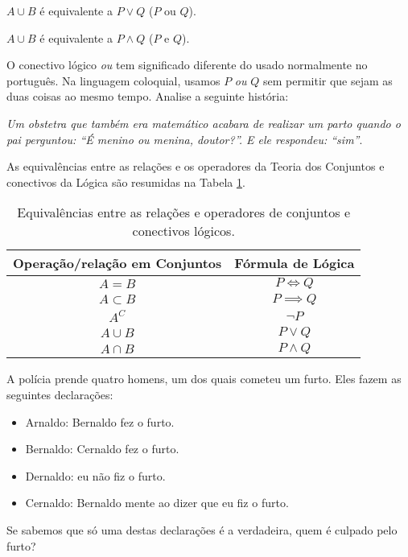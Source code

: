 \begin{equivalence}
$A \cup B$ é equivalente a $P \lor Q$ ($P \text{ ou } Q$).
\end{equivalence}

\begin{equivalence}
$A \cup B$ é equivalente a $P \land Q$ ($P \text{ e } Q$).
\end{equivalence}

\begin{remark}
O conectivo lógico \textit{ou} tem significado diferente do usado normalmente no português. Na linguagem coloquial, usamos $P$ \textit{ou} $Q$ sem permitir que sejam as duas coisas ao mesmo tempo. Analise a seguinte história:\newline

\textit{Um obstetra que também era matemático acabara de realizar um parto quando o pai perguntou: ``É menino ou menina, doutor?''. E ele respondeu: ``sim''}.
\end{remark}

As equivalências entre as relações e os operadores da Teoria dos Conjuntos e conectivos da Lógica são resumidas na Tabela \ref{tbl:equiv-conj-logc}.

\begin{table}[h]
\begin{center}
\caption{Equivalências entre as relações e operadores de conjuntos e conectivos lógicos.}
\label{tbl:equiv-conj-logc}
\begin{tabular}{|c|c|}
	\hline
	Operação/relação em Conjuntos & Fórmula de Lógica \\\hline
	$A=B$ & $P \iff Q$ \\ \hline
	$A \subset B$ & $P \implies Q$ \\ \hline
	$A^C$ & $\neg P$ \\ \hline
	$A \cup B$ & $P \lor Q$ \\ \hline
	$A \cap B$ & $P \land Q$ \\
	\hline
\end{tabular}
\end{center}
\end{table}

\begin{problem}
A polícia prende quatro homens, um dos quais cometeu um furto. Eles fazem as seguintes declarações:
%
\begin{itemize}[leftmargin=*]
  \item Arnaldo: Bernaldo fez o furto.
  \item Bernaldo: Cernaldo fez o furto.
  \item Dernaldo: eu não fiz o furto.
  \item Cernaldo: Bernaldo mente ao dizer que eu fiz o furto.
\end{itemize}
%
Se sabemos que só uma destas declarações é a verdadeira, quem é culpado pelo furto?
\end{problem}
